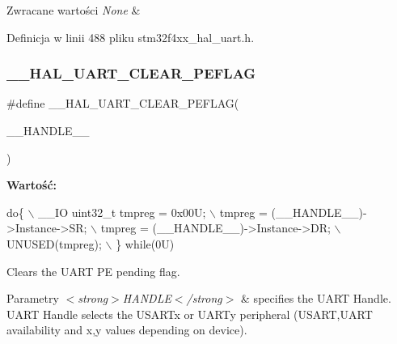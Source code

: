 \begin{DoxyRetVals}{Zwracane wartości}
{\em None} & \\
\hline
\end{DoxyRetVals}


Definicja w linii 488 pliku stm32f4xx\+\_\+hal\+\_\+uart.\+h.

\mbox{\label{group___u_a_r_t___exported___macros_gaba5e19c60e0f37341b1585a380b84d49}} 
\subsubsection{\texorpdfstring{\+\_\+\+\_\+\+H\+A\+L\+\_\+\+U\+A\+R\+T\+\_\+\+C\+L\+E\+A\+R\+\_\+\+P\+E\+F\+L\+AG}{\_\_HAL\_UART\_CLEAR\_PEFLAG}}
{\footnotesize\ttfamily \#define \+\_\+\+\_\+\+H\+A\+L\+\_\+\+U\+A\+R\+T\+\_\+\+C\+L\+E\+A\+R\+\_\+\+P\+E\+F\+L\+AG(\begin{DoxyParamCaption}\item[{}]{\+\_\+\+\_\+\+H\+A\+N\+D\+L\+E\+\_\+\+\_\+ }\end{DoxyParamCaption})}

{\bfseries Wartość\+:}
\begin{DoxyCode}
\textcolor{keywordflow}{do}\{                                           \(\backslash\)
    \_\_IO uint32\_t tmpreg = 0x00U;               \(\backslash\)
    tmpreg = (\_\_HANDLE\_\_)->Instance->SR;        \(\backslash\)
    tmpreg = (\_\_HANDLE\_\_)->Instance->DR;        \(\backslash\)
    UNUSED(tmpreg);                             \(\backslash\)
  \} \textcolor{keywordflow}{while}(0U)
\end{DoxyCode}


Clears the U\+A\+RT PE pending flag. 


\begin{DoxyParams}{Parametry}
{\em $<$strong$>$\+H\+A\+N\+D\+L\+E$<$/strong$>$} & specifies the U\+A\+RT Handle. U\+A\+RT Handle selects the U\+S\+A\+R\+Tx or U\+A\+R\+Ty peripheral (U\+S\+A\+RT,U\+A\+RT availability and x,y values depending on device). \\
\hline
\end{DoxyParams}

